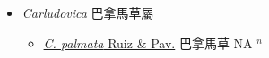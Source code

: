 
  \begin{itemize}
 \item[] \textit{Carludovica} 巴拿馬草屬
                    
  \begin{itemize}
        \item[] \href{http://www.theplantlist.org/tpl1.1/search?q=Carludovica+palmata}{\textit{C. palmata} Ruiz \& Pav.}   巴拿馬草 NA $^n$
  \end{itemize}
  \end{itemize}
